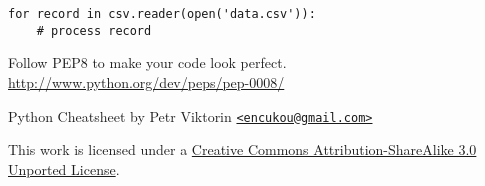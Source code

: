 \documentclass[10pt]{article}
\newenvironment{items}{\begin{itemize*}\setlength\itemsep{0pt}\setlength\parskip{0pt}\setlength\parsep{0pt}}{\end{itemize*}}
\begin{document}
\begin{items}
\begin{multicols}{2}
\begin{verbatim}
for record in csv.reader(open('data.csv')):
    # process record
\end{verbatim}
\columnbreak
\end{multicols}

\item Follow PEP8 to make your code look perfect.
\\\url{http://www.python.org/dev/peps/pep-0008/}
\end{items}



\vfill\footnotesize
Python Cheatsheet by Petr Viktorin \href{mailto:encukou@gmail.com}{\texttt{<encukou@gmail.com>}}

This work is licensed under a \href{http://creativecommons.org/licenses/by-sa/3.0/}{Creative Commons Attribution-ShareAlike 3.0 Unported License}.
\end{document}
